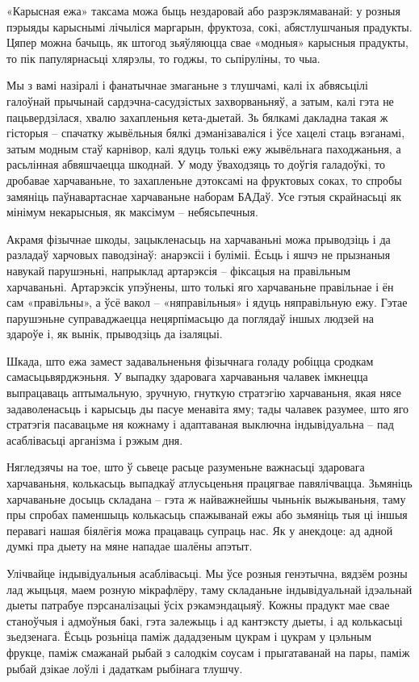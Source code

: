 «Карысная ежа» таксама можа быць нездаровай або разрэклямаванай: у розныя пэрыяды карыснымі лічыліся маргарын, фруктоза, сокі, абястлушчаныя прадукты. Цяпер можна бачыць, як штогод зьяўляюцца свае «модныя» карысныя прадукты, то пік папулярнасьці хлярэлы, то годжы, то сьпіруліны, то чыа.

Мы з вамі назіралі і фанатычнае змаганьне з тлушчамі, калі іх абвясьцілі галоўнай прычынай сардэчна-сасудзістых захворваньняў, а затым, калі гэта не пацьвердзілася, хвалю захапленьня кета-дыетай. Зь бялкамі дакладна такая ж гісторыя – спачатку жывёльныя бялкі дэманізаваліся і ўсе хацелі стаць вэганамі, затым модным стаў карнівор, калі ядуць толькі ежу жывёльнага паходжаньня, а расьлінная абвяшчаецца шкоднай. У моду ўваходзяць то доўгія галадоўкі, то дробавае харчаваньне, то захапленьне дэтоксамі на фруктовых соках, то спробы замяніць паўнавартаснае харчаваньне наборам БАДаў. Усе гэтыя скрайнасьці як мінімум некарысныя, як максімум – небясьпечныя.

Акрамя фізычнае шкоды, зацыкленасьць на харчаваньні можа прыводзіць і да разладаў харчовых паводзінаў: анарэксіі і буліміі. Ёсьць і яшчэ не прызнаныя навукай парушэньні, напрыклад артарэксія – фіксацыя на правільным харчаваньні. Артарэксік упэўнены, што толькі яго харчаваньне правільнае і ён сам «правільны», а ўсё вакол – «няправільныя» і ядуць няправільную ежу. Гэтае парушэньне суправаджаецца нецярпімасьцю да поглядаў іншых людзей на здароўе і, як вынік, прыводзіць да ізаляцыі.

Шкада, што ежа замест задавальненьня фізычнага голаду робіцца сродкам самасьцьвярджэньня. У выпадку здаровага харчаваньня чалавек імкнецца выпрацаваць аптымальную, зручную, гнуткую стратэгію харчаваньня, якая нясе задаволенасьць і карысьць ды пасуе менавіта яму; тады чалавек разумее, што яго стратэгія пасавацьме ня кожнаму і адаптаваная выключна індывідуальна – пад асаблівасьці арганізма і рэжым дня.

Нягледзячы на тое, што ў сьвеце расьце разуменьне важнасьці здаровага харчаваньня, колькасьць выпадкаў атлусьценьня працягвае павялічвацца. Зьмяніць харчаваньне досыць складана – гэта ж найважнейшы чыньнік выжываньня, таму пры спробах паменшыць колькасьць спажыванай ежы або зьмяніць тыя ці іншыя перавагі нашая біялёгія можа працаваць супраць нас. Як у анекдоце: ад адной думкі пра дыету на мяне нападае шалёны апэтыт.

Улічвайце індывідуальныя асаблівасьці. Мы ўсе розныя генэтычна, вядзём розны лад жыцьця, маем розную мікрафлёру, таму складаньне індывідуальнай ідэальнай дыеты патрабуе пэрсаналізацыі ўсіх рэкамэндацыяў. Кожны прадукт мае свае станоўчыя і адмоўныя бакі, гэта залежыць і ад кантэксту дыеты, і ад колькасьці зьедзенага. Ёсьць розьніца паміж дададзеным цукрам і цукрам у цэльным фрукце, паміж смажанай рыбай з салодкім соусам і прыгатаванай на пары, паміж рыбай дзікае лоўлі і дадаткам рыбінага тлушчу.

